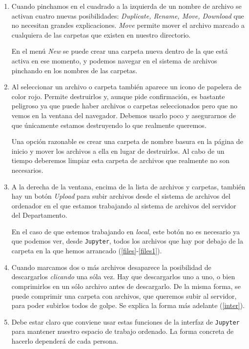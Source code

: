 \begin{enumerate}
	
	\item Cuando pinchamos en el cuadrado a la izquierda de un nombre de archivo se activan cuatro nuevas posibilidades: {\itshape Duplicate, Rename, Move, Download} que no necesitan grandes explicaciones. {\itshape Move} permite mover el archivo marcado a cualquiera de las carpetas que existen en nuestro directorio. 
	
	En el men\'u {\itshape New} se puede crear una carpeta nueva dentro de la que est\'a activa en ese momento, y podemos navegar en el sistema de archivos pinchando en los nombres de las carpetas.
	
	\item Al seleccionar un archivo o carpeta tambi\'en aparece un icono de papelera de color rojo. Permite destruirlos y, aunque pide confirmaci\'on, es {\sc bastante peligroso} ya que puede haber archivos o carpetas seleccionados pero que no vemos en la ventana del navegador. Debemos usarlo  poco y asegurarnos de que \'unicamente estamos destruyendo lo que realmente queremos. 
	
	Una opci\'on razonable es crear una carpeta de nombre {\sc basura} en la p\'agina de inicio y mover los archivos a ella en lugar de destruirlos. Al cabo de un tiempo deberemos limpiar esta carpeta de archivos que realmente no son necesarios. 
	
	\item A la derecha de la ventana, encima de la lista de archivos y carpetas, tambi\'en hay un bot\'on {\itshape Upload} para subir archivos desde el sistema de archivos del ordenador en el que estamos trabajando al sistema de archivos del servidor del Departamento. 
	
	En el caso de que estemos trabajando en {\itshape local}, este bot\'on {\sc no es necesario} ya que podemos ver, desde {\tt Jupyter},  todos los archivos que hay por debajo de la carpeta en la que hemos arrancado (\ref{files}-\ref{files1}).   
	
	\item Cuando marcamos dos o m\'as archivos desaparece la posibilidad de descargarlos {\itshape clicando} una s\'ola vez. Hay que descargarlos uno a uno, o bien comprimirlos en  un s\'olo archivo antes de  descargarlo. De la misma forma, se puede comprimir una carpeta con archivos, que queremos subir al servidor,  para poder subirlos todos de golpe. Se explica la forma m\'as adelante (\ref{inter}).   
\item Debe estar claro que conviene usar  estas funciones de la interfaz de {\tt Jupyter} para mantener nuestro {\sc espacio de trabajo ordenado}. La forma concreta de hacerlo  depender\'a de cada persona. 
	
\end{enumerate}

